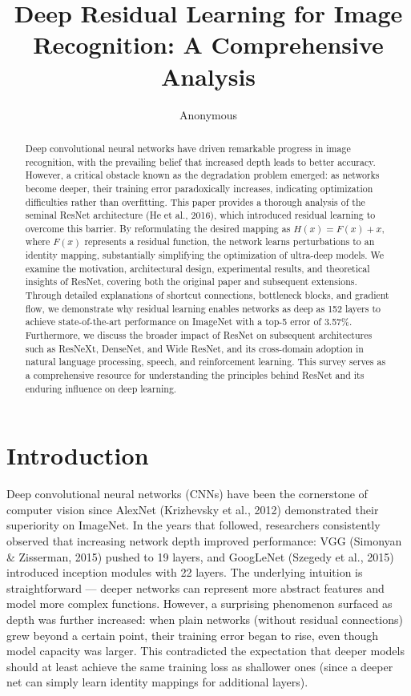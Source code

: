 \documentclass[11pt,a4paper]{article}
\title{Deep Residual Learning for Image Recognition: A Comprehensive Analysis}
\author{Anonymous}
\date{}
\begin{document}
\maketitle

\begin{abstract}
Deep convolutional neural networks have driven remarkable progress in image recognition, with the prevailing belief that increased depth leads to better accuracy. However, a critical obstacle known as the degradation problem emerged: as networks become deeper, their training error paradoxically increases, indicating optimization difficulties rather than overfitting. This paper provides a thorough analysis of the seminal ResNet architecture (He et al., 2016), which introduced residual learning to overcome this barrier. By reformulating the desired mapping as $H(x) = F(x) + x$, where $F(x)$ represents a residual function, the network learns perturbations to an identity mapping, substantially simplifying the optimization of ultra-deep models. We examine the motivation, architectural design, experimental results, and theoretical insights of ResNet, covering both the original paper and subsequent extensions. Through detailed explanations of shortcut connections, bottleneck blocks, and gradient flow, we demonstrate why residual learning enables networks as deep as 152 layers to achieve state-of-the-art performance on ImageNet with a top-5 error of 3.57\%. Furthermore, we discuss the broader impact of ResNet on subsequent architectures such as ResNeXt, DenseNet, and Wide ResNet, and its cross-domain adoption in natural language processing, speech, and reinforcement learning. This survey serves as a comprehensive resource for understanding the principles behind ResNet and its enduring influence on deep learning.
\end{abstract}

\section{Introduction}
\label{sec:intro}

Deep convolutional neural networks (CNNs) have been the cornerstone of computer vision since AlexNet (Krizhevsky et al., 2012) demonstrated their superiority on ImageNet. In the years that followed, researchers consistently observed that increasing network depth improved performance: VGG (Simonyan \& Zisserman, 2015) pushed to 19 layers, and GoogLeNet (Szegedy et al., 2015) introduced inception modules with 22 layers. The underlying intuition is straightforward — deeper networks can represent more abstract features and model more complex functions. However, a surprising phenomenon surfaced as depth was further increased: when plain networks (without residual connections) grew beyond a certain point, their training error began to rise, even though model capacity was larger. This contradicted the expectation that deeper models should at least achieve the same training loss as shallower ones (since a deeper net can simply learn identity mappings for additional layers).
\end{document}
